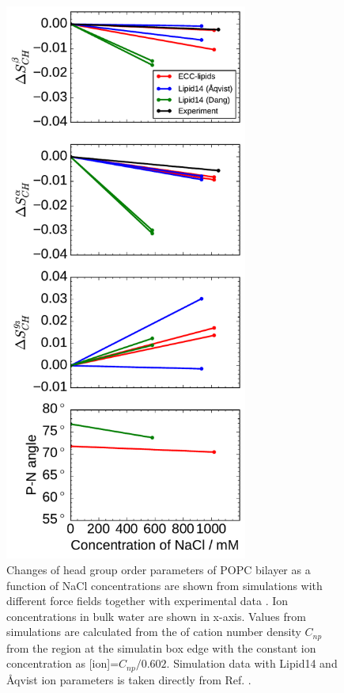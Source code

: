 \documentclass[aip,jcp,twocolumn]{revtex4}
\begin{document}
\begin{figure}[tbp]
  \centering
  \includegraphics[width=8.0cm]{../Fig/ipython_nb/PN_angle_OrdPars-A-B-g3_L14-ECCL17_q80_sig89_NaCl.pdf}
  \caption{\label{fig:delta_ordPar_NaCl_si}
    Changes of head group order parameters of POPC bilayer as a function of NaCl concentrations
    are shown from simulations with different force fields together with experimental data \cite{akutsu81}. 
    Ion concentrations in bulk water are shown in x-axis. 
    Values from simulations are calculated from the of cation number density $C_{np}$
    from the region at the simulatin box edge with the constant ion concentration as [ion]=$C_{np}/0.602$.
    Simulation data with Lipid14 and \AA{}qvist ion parameters is taken directly from Ref. \cite{catte16}.
  }
\end{figure}
\end{document}
